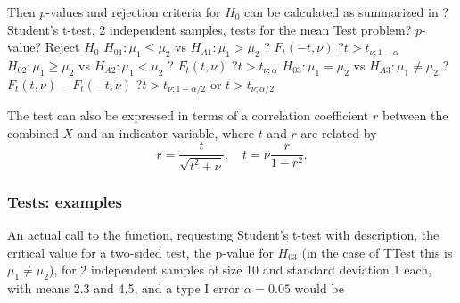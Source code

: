 \mpTableThreeColsThreeRows
{Then $p$-values and rejection criteria for $H_0$ can be calculated as summarized in ? Student's t-test, 2 independent samples, tests for the mean}
{Test problem? $p$-value? Reject $H_0$}
{$H_{01}: \mu_1 \leq \mu_2$ vs $H_{A1}: \mu_1 > \mu_2$ ? $F_t\left(-t, \nu\right)$ ?$t > t_{\nu;1-\alpha}$}
{$H_{02}: \mu_1 \geq \mu_2$ vs $H_{A2}: \mu_1 < \mu_2$ ? $F_t\left(t, \nu\right)$  ?$t > t_{\nu;\alpha}$}
{$H_{03}: \mu_1 = \mu_2$ vs $H_{A3}: \mu_1 \neq \mu_2$ ? $F_t\left(t, \nu\right)-F_t\left(-t, \nu\right)$ ?$t > t_{\nu;1-\alpha/2}$ or $t > t_{\nu;\alpha/2}$}


%


The test can also be expressed in terms of a correlation coefficient $r$ between the combined $X$ and an indicator variable, where $t$ and $r$ are related by
\begin{equation}
	r=\frac{t}{\sqrt{t^2+\nu}}, \quad t= \nu \frac{r}{1-r^2}.
\end{equation}



%



\subsubsection{Tests: examples}
An actual call to the function, requesting Student's t-test with description, the critical value for a two-sided test, the p-value for $H_{03}$ (in the case of \textsf{TTest} this is $\mu_1 \neq \mu_2$), for 2 independent samples of size 10 and standard deviation 1 each, with means 2.3 and 4.5, and a type I error $\alpha=0.05$ would be

